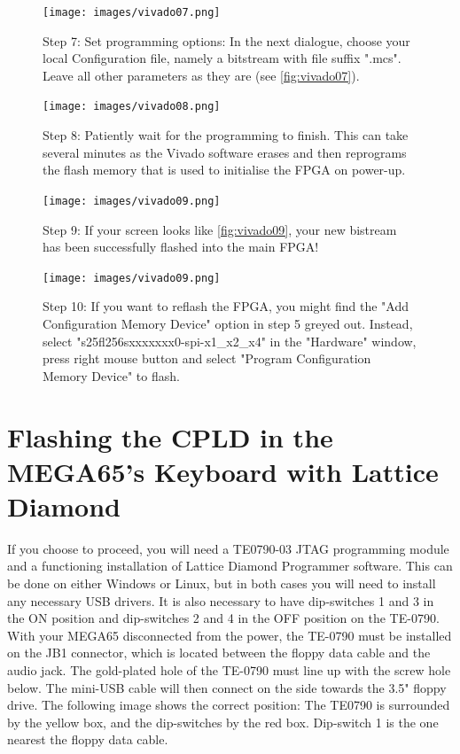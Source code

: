 \begin{figure}[H]
  \centering
  \texttt{[image: images/vivado07.png]}
  \captionsetup{width=0.85\linewidth}
  \caption{Step 7: Set programming options:
           In the next dialogue, choose your local Configuration file, namely
           a bitstream with file suffix ".mcs". Leave all other parameters
           as they are (see \ref{fig:vivado07}).}
  \label{fig:vivado07}

\vspace{3mm}

  \texttt{[image: images/vivado08.png]}
  \captionsetup{width=0.85\linewidth}
  \caption{Step 8: Patiently wait for the programming to finish.
           This can take several minutes as the Vivado software erases
           and then reprograms the flash memory that is used to
           initialise the FPGA on power-up.}
  \label{fig:vivado08}
\end{figure}


\begin{figure}[H]
  \centering
  \texttt{[image: images/vivado09.png]}
  \captionsetup{width=0.8\linewidth}
  \caption{Step 9: If your screen looks like \ref{fig:vivado09},
           your new bistream has been successfully flashed into the main FPGA!}
  \label{fig:vivado09}

\vspace{5mm}

  \texttt{[image: images/vivado09.png]}
  \captionsetup{width=0.8\linewidth}
  \caption{Step 10: If you want to reflash the FPGA, you might find the
  "Add Configuration Memory Device" option in step 5 greyed out.
   Instead, select "s25fl256sxxxxxxx0-spi-x1\_x2\_x4"  in the "Hardware"
   window, press right mouse button and select "Program Configuration
   Memory Device" to flash.}
  \label{fig:vivado10}
\end{figure}


\section{Flashing the CPLD in the MEGA65's Keyboard with Lattice Diamond}


If you choose to proceed, you will need a TE0790-03 JTAG programming
module and a functioning installation of Lattice Diamond Programmer software.
This can be done on either Windows or Linux, but in both cases you will
need to install any necessary USB drivers. It is also necessary to have
dip-switches 1 and 3 in the ON position and dip-switches 2 and 4 in the
OFF position on the TE-0790. With your MEGA65 disconnected from the power,
the TE-0790 must be installed on the JB1 connector, which is located
between the floppy data cable and the audio jack.
The gold-plated hole of the TE-0790 must line up with the screw hole below.
The mini-USB cable will then connect on the side towards the 3.5" floppy drive.
The following image shows the correct position: The TE0790 is surrounded
by the yellow box, and the dip-switches by the red box. Dip-switch 1 is
the one nearest the floppy data cable.



